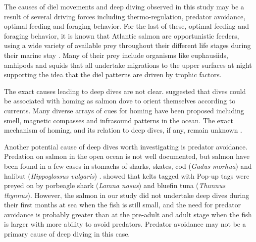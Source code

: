 The causes of diel movements and deep diving observed in this study may be a result of several driving forces including thermo-regulation, predator avoidance, optimal feeding and foraging behavior.
For the last of these, optimal feeding and foraging behavior, it is known that Atlantic salmon are opportunistic feeders, using a wide variety of available prey throughout their different life stages during their marine stay \citep{Rikardsen2011}. Many of their prey include organisms like euphausiids, amhipods and squids that all undertake migrations to the upper surfaces at night \citep{Walker2000} supporting the idea that the diel patterns are driven by trophic factors. 

The exact causes leading to deep dives are not clear. \cite{Westerberg1982a,Westerberg1982b} suggested that dives could be associated with homing as salmon dove to orient themselves according to currents. Many diverse arrays of cues for homing have been proposed including smell, magnetic compasses and infrasound patterns in the ocean. The exact mechanism of homing, and its relation to deep dives, if any, remain unknown \citep{Thorstad2011}.

Another potential cause of deep dives worth investigating is predator avoidance. Predation on salmon in the open ocean is not well documented, but salmon have been found in a few cases in stomachs of sharks, skates, cod (\textit{Gadus morhua}) and halibut (\textit{Hippoglossus vulgaris}) \citep{Ward2011}. \cite{Lacroix2014} showed that kelts tagged with Pop-up tags were preyed on by porbeagle shark (\textit{Lamna nasus}) and bluefin tuna (\textit{Thunnus thynnus}). However, the salmon in our study did not undertake deep dives during their first months at sea when the fish is still small, and the need for predator avoidance is probably greater than at the pre-adult and adult stage when the fish is larger with more ability to avoid predators. Predator avoidance may not be a primary cause of deep diving in this case.

